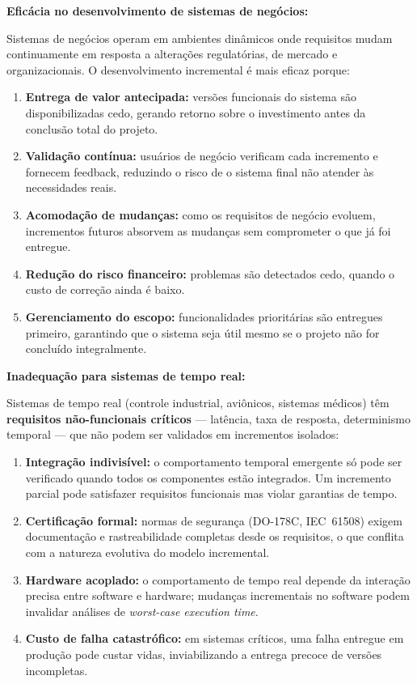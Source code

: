 \documentclass[12pt,a4paper]{article}
\begin{document}
\begin{resposta}

\textbf{Eficácia no desenvolvimento de sistemas de negócios:}

Sistemas de negócios operam em ambientes dinâmicos onde requisitos mudam
continuamente em resposta a alterações regulatórias, de mercado e
organizacionais. O desenvolvimento incremental é mais eficaz porque:

\begin{enumerate}[nosep]
  \item \textbf{Entrega de valor antecipada:} versões funcionais do sistema são
        disponibilizadas cedo, gerando retorno sobre o investimento antes da
        conclusão total do projeto.
  \item \textbf{Validação contínua:} usuários de negócio verificam cada incremento
        e fornecem feedback, reduzindo o risco de o sistema final não atender
        às necessidades reais.
  \item \textbf{Acomodação de mudanças:} como os requisitos de negócio evoluem,
        incrementos futuros absorvem as mudanças sem comprometer o que já foi entregue.
  \item \textbf{Redução do risco financeiro:} problemas são detectados cedo, quando
        o custo de correção ainda é baixo.
  \item \textbf{Gerenciamento do escopo:} funcionalidades prioritárias são entregues
        primeiro, garantindo que o sistema seja útil mesmo se o projeto não for
        concluído integralmente.
\end{enumerate}

\textbf{Inadequação para sistemas de tempo real:}

Sistemas de tempo real (controle industrial, aviônicos, sistemas médicos)
têm \textbf{requisitos não-funcionais críticos} --- latência, taxa de resposta,
determinismo temporal --- que não podem ser validados em incrementos isolados:

\begin{enumerate}[nosep]
  \item \textbf{Integração indivisível:} o comportamento temporal emergente só pode
        ser verificado quando todos os componentes estão integrados. Um incremento
        parcial pode satisfazer requisitos funcionais mas violar garantias de tempo.
  \item \textbf{Certificação formal:} normas de segurança (DO-178C, IEC~61508)
        exigem documentação e rastreabilidade completas desde os requisitos, o que
        conflita com a natureza evolutiva do modelo incremental.
  \item \textbf{Hardware acoplado:} o comportamento de tempo real depende da
        interação precisa entre software e hardware; mudanças incrementais no
        software podem invalidar análises de \textit{worst-case execution time}.
  \item \textbf{Custo de falha catastrófico:} em sistemas críticos, uma falha
        entregue em produção pode custar vidas, inviabilizando a entrega precoce
        de versões incompletas.
\end{enumerate}

\end{resposta}
\end{document}

